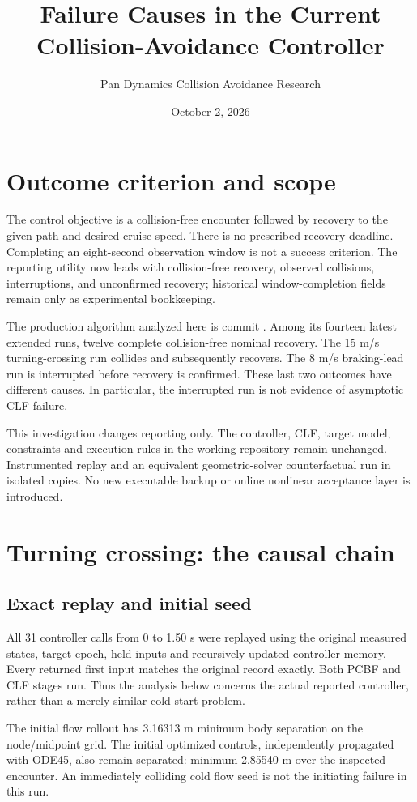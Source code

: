 \documentclass[11pt]{article}
\title{Failure Causes in the Current Collision-Avoidance Controller}
\author{Pan Dynamics Collision Avoidance Research}
\date{October 2, 2026}
\begin{document}
\maketitle

\section{Outcome criterion and scope}
The control objective is a collision-free encounter followed by recovery to
the given path and desired cruise speed. There is no prescribed recovery
deadline. Completing an eight-second observation window is not a success
criterion. The reporting utility now leads with collision-free recovery,
observed collisions, interruptions, and unconfirmed recovery; historical
window-completion fields remain only as experimental bookkeeping.

The production algorithm analyzed here is commit
. Among its fourteen latest
extended runs, twelve complete collision-free nominal recovery. The
15 m/s turning-crossing run collides and subsequently recovers. The 8 m/s
braking-lead run is interrupted before recovery is confirmed. These last
two outcomes have different causes. In particular, the interrupted run is
not evidence of asymptotic CLF failure.

This investigation changes reporting only. The controller, CLF, target
model, constraints and execution rules in the working repository remain
unchanged. Instrumented replay and an equivalent geometric-solver
counterfactual run in isolated copies. No new executable backup or online
nonlinear acceptance layer is introduced.

\section{Turning crossing: the causal chain}
\subsection{Exact replay and initial seed}
All 31 controller calls from 0 to 1.50 s were replayed using the original
measured states, target epoch, held inputs and recursively updated controller
memory. Every returned first input matches the original record exactly.
Both PCBF and CLF stages run. Thus the analysis below concerns the actual
reported controller, rather than a merely similar cold-start problem.

The initial flow rollout has 3.16313 m minimum body separation on the
node/midpoint grid. The initial optimized controls, independently propagated
with ODE45, also remain separated: minimum 2.85540 m over the inspected
encounter. An immediately colliding cold flow seed is not the initiating
failure in this run.
\end{document}
